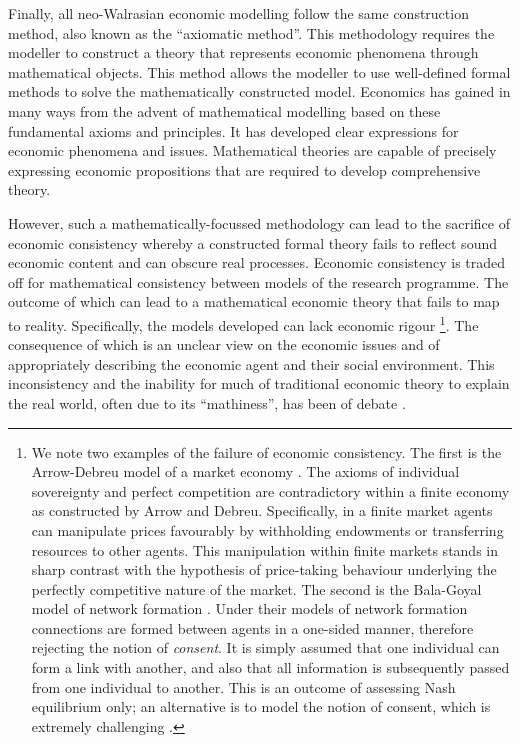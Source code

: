 Finally, all neo-Walrasian economic modelling follow the same construction method, also known as the ``axiomatic method''. This methodology requires the modeller to construct a theory that represents economic phenomena through mathematical objects. This method allows the modeller to use well-defined formal methods to solve the mathematically constructed model. Economics has gained in many ways from the advent of mathematical modelling based on these fundamental axioms and principles. It has developed clear expressions for economic phenomena and issues. Mathematical theories are capable of precisely expressing economic propositions that are required to develop comprehensive theory.

However, such a mathematically-focussed methodology can lead to the sacrifice of economic consistency whereby a constructed formal theory fails to reflect sound economic content and can obscure real processes. Economic consistency is traded off for mathematical consistency between models of the research programme. The outcome of which can lead to a mathematical economic theory that fails to map to reality. Specifically, the models developed can lack economic rigour \footnote{We note two examples of the failure of economic consistency. The first is the Arrow-Debreu model of a market economy \citep{ArrowDebreu1954}. The axioms of individual sovereignty and perfect competition are contradictory within a finite economy as constructed by Arrow and Debreu. Specifically, in a finite market agents can manipulate prices favourably by withholding endowments or transferring resources to other agents. This manipulation within finite markets stands in sharp contrast with the hypothesis of price-taking behaviour underlying the perfectly competitive nature of the market. The second is the Bala-Goyal model of network formation \citep{BalaGoyal2000a}. Under their models of network formation connections are formed between agents in a one-sided manner, therefore rejecting the notion of \emph{consent}. It is simply assumed that one individual can form a link with another, and also that all information is subsequently passed from one individual to another. This is an outcome of assessing Nash equilibrium only; an alternative is to model the notion of consent, which is extremely challenging \citep{GillesSarangi-Building, GillesSarangi2010}.}. The consequence of which is an unclear view on the economic issues and of appropriately describing the economic agent and their social environment. This inconsistency and the inability for much of traditional economic theory to explain the real world, often due to its ``mathiness'', has been of debate \citep{Romer2015}.


